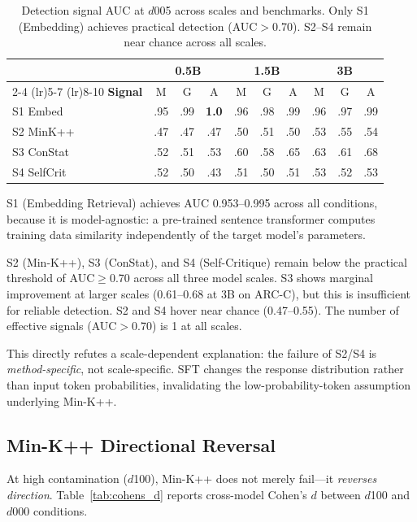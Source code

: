 \documentclass[11pt,a4paper]{article}
\begin{document}
\begin{table}[t]
\centering
\small
\caption{Detection signal AUC at $d$005 across scales and benchmarks. Only S1 (Embedding) achieves practical detection (AUC$>$0.70). S2--S4 remain near chance across all scales.}
\label{tab:signal_auc}
\begin{tabular}{@{}l ccc ccc ccc@{}}
\toprule
& \multicolumn{3}{c}{\textbf{0.5B}} & \multicolumn{3}{c}{\textbf{1.5B}} & \multicolumn{3}{c}{\textbf{3B}} \\
\cmidrule(lr){2-4} \cmidrule(lr){5-7} \cmidrule(lr){8-10}
\textbf{Signal} & M & G & A & M & G & A & M & G & A \\
\midrule
S1 Embed & .95 & .99 & \textbf{1.0} & .96 & .98 & .99 & .96 & .97 & .99 \\
S2 MinK++ & .47 & .47 & .47 & .50 & .51 & .50 & .53 & .55 & .54 \\
S3 ConStat & .52 & .51 & .53 & .60 & .58 & .65 & .63 & .61 & .68 \\
S4 SelfCrit & .52 & .50 & .43 & .51 & .50 & .51 & .53 & .52 & .53 \\
\bottomrule
\end{tabular}
\vspace{-2mm}
\end{table}

S1 (Embedding Retrieval) achieves AUC 0.953--0.995 across all conditions, because it is model-agnostic: a pre-trained sentence transformer computes training data similarity independently of the target model's parameters.

S2 (Min-K++), S3 (ConStat), and S4 (Self-Critique) remain below the practical threshold of AUC$\geq$0.70 across all three model scales.
S3 shows marginal improvement at larger scales (0.61--0.68 at 3B on ARC-C), but this is insufficient for reliable detection.
S2 and S4 hover near chance (0.47--0.55).
The number of effective signals (AUC$>$0.70) is 1 at all scales.

This directly refutes a scale-dependent explanation: the failure of S2/S4 is \emph{method-specific}, not scale-specific.
SFT changes the response distribution rather than input token probabilities, invalidating the low-probability-token assumption underlying Min-K++.

\subsection{Min-K++ Directional Reversal}
\label{sec:reversal}

At high contamination ($d$100), Min-K++ does not merely fail---it \emph{reverses direction}.
Table~\ref{tab:cohens_d} reports cross-model Cohen's $d$ between $d$100 and $d$000 conditions.
\end{document}
